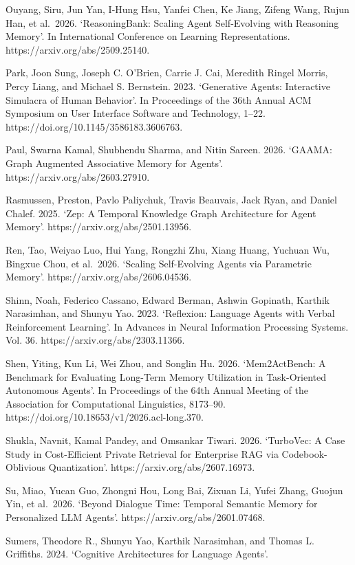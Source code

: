 \documentclass[
  english,
  a4paper,
  DIV=11,
  numbers=noendperiod]{scrreprt}
\begin{document}
Ouyang, Siru, Jun Yan, I-Hung Hsu, Yanfei Chen, Ke Jiang, Zifeng Wang,
Rujun Han, et al.~2026. `ReasoningBank: Scaling Agent Self-Evolving with
Reasoning Memory'. In International Conference on Learning
Representations. https://arxiv.org/abs/2509.25140.

Park, Joon Sung, Joseph C. O'Brien, Carrie J. Cai, Meredith Ringel
Morris, Percy Liang, and Michael S. Bernstein. 2023. `Generative Agents:
Interactive Simulacra of Human Behavior'. In Proceedings of the 36th
Annual ACM Symposium on User Interface Software and Technology, 1--22.
https://doi.org/10.1145/3586183.3606763.

Paul, Swarna Kamal, Shubhendu Sharma, and Nitin Sareen. 2026. `GAAMA:
Graph Augmented Associative Memory for Agents'.
https://arxiv.org/abs/2603.27910.

Rasmussen, Preston, Pavlo Paliychuk, Travis Beauvais, Jack Ryan, and
Daniel Chalef. 2025. `Zep: A Temporal Knowledge Graph Architecture for
Agent Memory'. https://arxiv.org/abs/2501.13956.

Ren, Tao, Weiyao Luo, Hui Yang, Rongzhi Zhu, Xiang Huang, Yuchuan Wu,
Bingxue Chou, et al.~2026. `Scaling Self-Evolving Agents via Parametric
Memory'. https://arxiv.org/abs/2606.04536.

Shinn, Noah, Federico Cassano, Edward Berman, Ashwin Gopinath, Karthik
Narasimhan, and Shunyu Yao. 2023. `Reflexion: Language Agents with
Verbal Reinforcement Learning'. In Advances in Neural Information
Processing Systems. Vol. 36. https://arxiv.org/abs/2303.11366.

Shen, Yiting, Kun Li, Wei Zhou, and Songlin Hu. 2026. `Mem2ActBench: A
Benchmark for Evaluating Long-Term Memory Utilization in Task-Oriented
Autonomous Agents'. In Proceedings of the 64th Annual Meeting of the
Association for Computational Linguistics, 8173--90.
https://doi.org/10.18653/v1/2026.acl-long.370.

Shukla, Navnit, Kamal Pandey, and Omsankar Tiwari. 2026. `TurboVec: A
Case Study in Cost-Efficient Private Retrieval for Enterprise RAG via
Codebook-Oblivious Quantization'. https://arxiv.org/abs/2607.16973.

Su, Miao, Yucan Guo, Zhongni Hou, Long Bai, Zixuan Li, Yufei Zhang,
Guojun Yin, et al.~2026. `Beyond Dialogue Time: Temporal Semantic Memory
for Personalized LLM Agents'. https://arxiv.org/abs/2601.07468.

Sumers, Theodore R., Shunyu Yao, Karthik Narasimhan, and Thomas L.
Griffiths. 2024. `Cognitive Architectures for Language Agents'.
\end{document}
